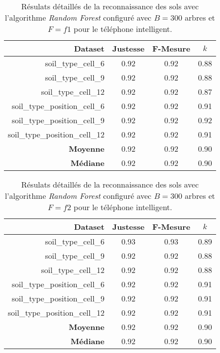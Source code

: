 \begin{table}[H]\renewcommand{\arraystretch}{0.5}
	\centering
	\caption{Résulats détaillés de la reconnaissance des sols avec l'algorithme \textit{Random Forest} configuré avec $B=300$ arbres et $F=f1$ pour le téléphone intelligent.}
	\label{tab:rf-300-f1-cell}
	\begin{tabular}{@{}rccc@{}}
		\toprule
			\textbf{Dataset} & \textbf{Justesse} & \textbf{F-Mesure} & \textbf{$k$} \\
		\midrule
			soil\_type\_cell\_6 & 0.92 & 0.92 & 0.88 \\
			soil\_type\_cell\_9 & 0.92 & 0.92 & 0.88 \\
			soil\_type\_cell\_12 & 0.92 & 0.92 & 0.87 \\
			soil\_type\_position\_cell\_6 & 0.92 & 0.92 & 0.91 \\
			soil\_type\_position\_cell\_9 & 0.92 & 0.92 & 0.92 \\
			soil\_type\_position\_cell\_12 & 0.92 & 0.92 & 0.91 \\
			\textbf{Moyenne} & 0.92 & 0.92 & 0.90 \\
			\textbf{Médiane} & 0.92 & 0.92 & 0.90 \\
		\bottomrule
	\end{tabular}
\end{table}

\begin{table}[H]\renewcommand{\arraystretch}{0.5}
	\centering
	\caption{Résulats détaillés de la reconnaissance des sols avec l'algorithme \textit{Random Forest} configuré avec $B=300$ arbres et $F=f2$ pour le téléphone intelligent.}
	\label{tab:rf-300-f2-cell}
	\begin{tabular}{@{}rccc@{}}
		\toprule
			\textbf{Dataset} & \textbf{Justesse} & \textbf{F-Mesure} & \textbf{$k$} \\
		\midrule
			soil\_type\_cell\_6 & 0.93 & 0.93 & 0.89 \\
			soil\_type\_cell\_9 & 0.92 & 0.92 & 0.88 \\
			soil\_type\_cell\_12 & 0.92 & 0.92 & 0.88 \\
			soil\_type\_position\_cell\_6 & 0.92 & 0.92 & 0.91 \\
			soil\_type\_position\_cell\_9 & 0.92 & 0.92 & 0.91 \\
			soil\_type\_position\_cell\_12 & 0.92 & 0.92 & 0.91 \\
			\textbf{Moyenne} & 0.92 & 0.92 & 0.90 \\
			\textbf{Médiane} & 0.92 & 0.92 & 0.90 \\
		\bottomrule
	\end{tabular}
\end{table}

